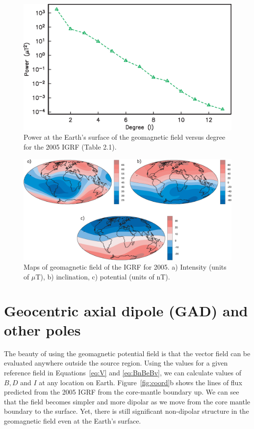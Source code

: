\begin{figure}[htb]
\centering  \includegraphics[width=11 cm]{EPSfiles/power.eps}
\caption{ Power at the Earth's surface of the geomagnetic field versus degree for the 2005 IGRF  (Table 2.1). }
\label{fig:power}
\end{figure}



\begin{figure}[htb]
\centering  \includegraphics[width=14 cm]{EPSfiles/B.eps}
\caption {Maps of geomagnetic field of the IGRF for 2005.
a) Intensity (units of $\mu$T), b) inclination, c) potential (units of nT).}
\label{fig:B}
\end{figure}



\section{Geocentric axial dipole (GAD) and other poles}
\label{sect:gad}

The beauty of using the geomagnetic potential field is that the vector field can be evaluated anywhere outside the source region.      Using the 
values for a given reference field in   
  Equations~\ref{eq:V} and \ref{eq:BnBeBv}, we can   calculate
 values of $B, D$ and $I$ at any location on Earth.    Figure~\ref{fig:coord}b shows the lines of flux predicted from the 2005 IGRF from  the core-mantle boundary up.   We can see that the field becomes simpler and more dipolar as we move from the core mantle boundary to the surface.  Yet, there is still significant non-dipolar structure in the geomagnetic field even at the Earth's surface.  
 
